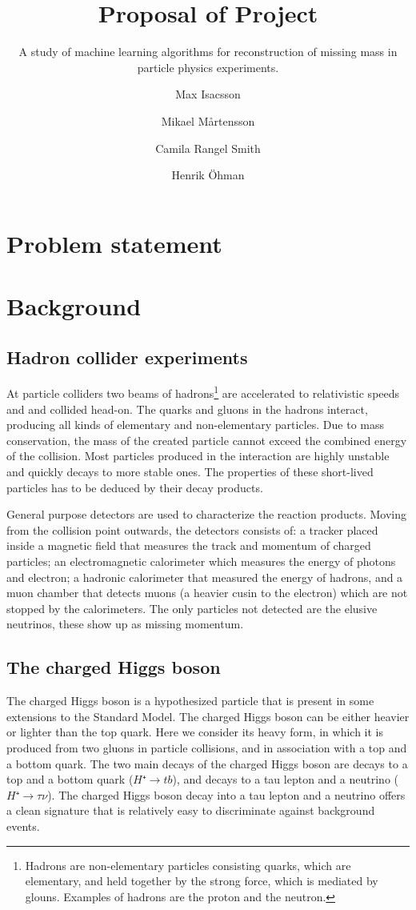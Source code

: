 \documentclass{scrartcl}
\title{Proposal of Project}
\subtitle{A study of machine learning algorithms for reconstruction of missing mass in particle physics experiments.}
\author[1]{Max Isacsson}
\author[2]{Mikael M\aa rtensson}
\author[3]{Camila Rangel Smith}
\author[4]{Henrik \"{O}hman}
\affil[1]{\small\url{max.isacsson@physics.uu.se}}
\affil[2]{\url{mikael.martensson@physics.uu.se}}
\affil[3]{\url{camila.rangel@physics.uu.se}}
\affil[4]{\url{ohman@cern.ch}}
\begin{document}
\maketitle

\section{Problem statement}


\section{Background}
\subsection{Hadron collider experiments}
At particle colliders two beams of hadrons\footnote{Hadrons are non-elementary particles consisting quarks, which are elementary, and held together by the strong force, which is mediated by glouns. Examples of hadrons are the proton and the neutron.} are accelerated to relativistic speeds and and collided head-on. The quarks and gluons in the hadrons interact, producing all kinds of elementary and non-elementary particles. Due to mass conservation, the mass of the created particle cannot exceed the combined energy of the collision. Most particles produced in the interaction are highly unstable and quickly decays to more stable ones. The properties of these short-lived particles has to be deduced by their decay products.

General purpose detectors are used to characterize the reaction products. Moving from the collision point outwards, the detectors consists of: a tracker placed inside a magnetic field that measures the track and momentum of charged particles; an electromagnetic calorimeter which measures the energy of photons and electron; a hadronic calorimeter that measured the energy of hadrons, and a muon chamber that detects muons (a heavier cusin to the electron) which are not stopped by the calorimeters. The only particles not detected are the elusive neutrinos, these show up as missing momentum.

\subsection{The charged Higgs boson}
The charged Higgs boson is a hypothesized particle that is present in some extensions to the Standard Model. The charged Higgs boson can be either heavier or lighter than the top quark. Here we consider its heavy form, in which it is produced from two gluons in particle collisions, and in association with a top and a bottom quark. The two main decays of the charged Higgs boson are decays to a top and a bottom quark ($H⁺→tb$), and decays to a tau lepton and a neutrino ($H⁺→τν$). The charged Higgs boson decay into a tau lepton and a neutrino offers a clean signature that is relatively easy to discriminate against background events.
\end{document}
